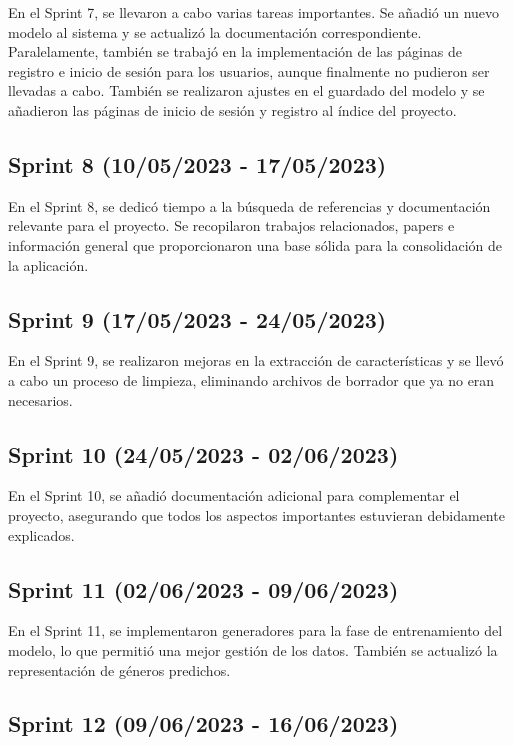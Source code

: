 En el Sprint 7, se llevaron a cabo varias tareas importantes. Se añadió un nuevo modelo al sistema y se actualizó la documentación correspondiente. Paralelamente, también se trabajó en la implementación de las páginas de registro e inicio de sesión para los usuarios, aunque finalmente no pudieron ser llevadas a cabo. También se realizaron ajustes en el guardado del modelo y se añadieron las páginas de inicio de sesión y registro al índice del proyecto.

\subsection{Sprint 8 (10/05/2023 - 17/05/2023)}

En el Sprint 8, se dedicó tiempo a la búsqueda de referencias y documentación relevante para el proyecto. Se recopilaron trabajos relacionados, papers e información general que proporcionaron una base sólida para la consolidación de la aplicación.

\subsection{Sprint 9 (17/05/2023 - 24/05/2023)}

En el Sprint 9, se realizaron mejoras en la extracción de características y se llevó a cabo un proceso de limpieza, eliminando archivos de borrador que ya no eran necesarios.

\subsection{Sprint 10 (24/05/2023 - 02/06/2023)}

En el Sprint 10, se añadió documentación adicional para complementar el proyecto, asegurando que todos los aspectos importantes estuvieran debidamente explicados.

\subsection{Sprint 11 (02/06/2023 - 09/06/2023)}

En el Sprint 11, se implementaron generadores para la fase de entrenamiento del modelo, lo que permitió una mejor gestión de los datos. También se actualizó la representación de géneros predichos.

\subsection{Sprint 12 (09/06/2023 - 16/06/2023)}

